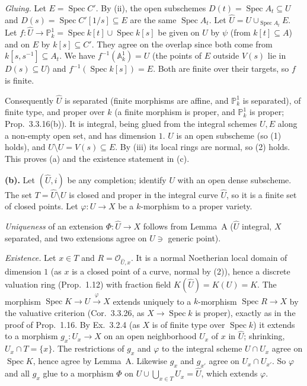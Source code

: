 \documentclass[11pt]{article}
\begin{document}
\emph{Gluing.} Let $E=\operatorname{Spec}C'$. By (ii), the open subschemes $D(t)=\operatorname{Spec}A_t\subseteq U$ and $D(s)=\operatorname{Spec}C'[1/s]\subseteq E$ are the same $\operatorname{Spec}A_t$. Let $\hat U=U\cup_{\operatorname{Spec}A_t}E$. Let $f:\hat U\to\mathbb P^1_k=\operatorname{Spec}k[t]\cup\operatorname{Spec}k[s]$ be given on $U$ by $\psi$ (from $k[t]\subseteq A$) and on $E$ by $k[s]\subseteq C'$. They agree on the overlap since both come from $k[s,s^{-1}]\subseteq A_t$. We have $f^{-1}(\mathbb A^1_k)=U$ (the points of $E$ outside $V(s)$ lie in $D(s)\subseteq U$) and $f^{-1}(\operatorname{Spec}k[s])=E$. Both are finite over their targets, so $f$ is finite.

Consequently $\hat U$ is separated (finite morphisms are affine, and $\mathbb P^1_k$ is separated), of finite type, and proper over $k$ (a finite morphism is proper, and $\mathbb P^1_k$ is proper; Prop.~3.3.16(b)). It is integral, being glued from the integral schemes $U,E$ along a non-empty open set, and has dimension $1$. $U$ is an open subscheme (so (1) holds), and $\hat U\setminus U=V(s)\subseteq E$. By (iii) its local rings are normal, so (2) holds. This proves (a) and the existence statement in (c).

\textbf{(b).} Let $(\hat U,i)$ be any completion; identify $U$ with an open dense subscheme. The set $T=\hat U\setminus U$ is closed and proper in the integral curve $\hat U$, so it is a finite set of closed points. Let $\varphi:U\to X$ be a $k$-morphism to a proper variety.

\emph{Uniqueness} of an extension $\Phi:\hat U\to X$ follows from Lemma~A ($\hat U$ integral, $X$ separated, and two extensions agree on $U\ni$ generic point).

\emph{Existence.} Let $x\in T$ and $R=\mathcal O_{\hat U,x}$. It is a normal Noetherian local domain of dimension $1$ (as $x$ is a closed point of a curve, normal by (2)), hence a discrete valuation ring (Prop.~1.12) with fraction field $K(\hat U)=K(U)=K$. The morphism $\operatorname{Spec}K\to U\xrightarrow{\varphi}X$ extends uniquely to a $k$-morphism $\operatorname{Spec}R\to X$ by the valuative criterion (Cor.~3.3.26, as $X\to\operatorname{Spec}k$ is proper), exactly as in the proof of Prop.~1.16. By Ex.~3.2.4 (as $X$ is of finite type over $\operatorname{Spec}k$) it extends to a morphism $g_x:U_x\to X$ on an open neighborhood $U_x$ of $x$ in $\hat U$; shrinking, $U_x\cap T=\{x\}$. The restrictions of $g_x$ and $\varphi$ to the integral scheme $U\cap U_x$ agree on $\operatorname{Spec}K$, hence agree by Lemma~A. Likewise $g_x$ and $g_{x'}$ agree on $U_x\cap U_{x'}$. So $\varphi$ and all $g_x$ glue to a morphism $\Phi$ on $U\cup\bigcup_{x\in T}U_x=\hat U$, which extends $\varphi$.
\end{document}
